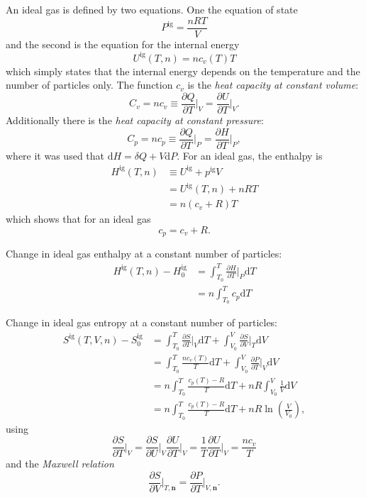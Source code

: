 \documentclass[english]{../thermomemo/thermomemo}
\newcommand{\pone}[3]{\frac{\partial #1}{\partial #2}\bigg|_{#3}}%
\newcommand*{\vektor}[1]{\boldsymbol{#1}}%
\newcommand{\dd}[1]{\mathrm{d}{#1}}
\begin{document}
An ideal gas is defined by two equations. One the equation of state
\begin{equation}
  P^\text{ig} = \frac{nRT}{V}
  \label{eq:idealgaslaw}
\end{equation}
and the second is the equation for the internal energy
\begin{equation}
  U^\text{ig}(T,n) = n c_v(T) T
  \label{eq:U_ideal}
\end{equation}
which simply states that the internal energy depends on the temperature and the number of particles only. The function $c_v$
is the \textit{heat capacity at constant volume}: 
\begin{equation}
  C_v = n c_v \equiv \pone{Q}{T}{V} = \pone{U}{T}{V}.
  \label{}
\end{equation}
Additionally there is the \textit{heat capacity at constant pressure}:
\begin{equation}
  C_p = n c_p \equiv \pone{Q}{T}{P} = \pone{H}{T}{P},
  \label{}
\end{equation}
where it was used that $\dd{H} = \delta Q + V\dd{P}$.
For an ideal gas, the enthalpy is 
\begin{align}
  H^\text{ig}(T,n) &\equiv U^\text{ig} + p^\text{ig}V 
  \nonumber\\
  &= U^\text{ig}(T,n) + nRT
  \nonumber\\
  &= n\left( c_v + R \right)T
  \label{}
\end{align}
which shows that for an ideal gas
\begin{equation}
  c_p = c_v + R.
  \label{}
\end{equation}

Change in ideal gas enthalpy at a constant number of particles:
\begin{align}
  H^\text{ig}(T,n) - H^\text{ig}_0 &= \int_{T_0}^T \pone{H}{T}{P} \dd{T}
  \nonumber\\
   &= n \int_{T_0}^T c_p \dd{T}
  \label{}
\end{align}

Change in ideal gas entropy at a constant number of particles:
\begin{align}
  S^\text{ig}(T,V,n) - S^\text{ig}_0 
  &= \int_{T_0}^T \pone{S}{T}{V} \dd{T} + \int_{V_0}^V \pone{S}{V}{T} \dd{V}
    \nonumber\\
    &=\int_{T_0}^T \frac{n c_v(T)}{T} \dd{T}
    + \int_{V_0}^V \pone{P}{T}{V} \dd{V}
    \nonumber\\
    &=n\int_{T_0}^T \frac{c_p(T) - R}{T} \dd{T}
    + nR\int_{V_0}^V \frac{1}{V} \dd{V}
    \nonumber\\
    &=n\int_{T_0}^T \frac{c_p(T) - R}{T} \dd{T}
    + nR\ln \left( \frac{V}{V_0} \right),
  \label{}
\end{align}
using 
\begin{equation}
  \pone{S}{T}{V} = \pone{S}{U}{V} \pone{U}{T}{V} = \frac{1}{T} \pone{U}{T}{V} = \frac{n c_v}{T} 
  \label{}
\end{equation}
and the \textit{Maxwell relation}
\begin{equation}
\label{eq:dsrel}
\pone{S}{V}{T,\vektor{n}} = \pone{P}{T}{V,\vektor{n}}.
\end{equation}
\end{document}

